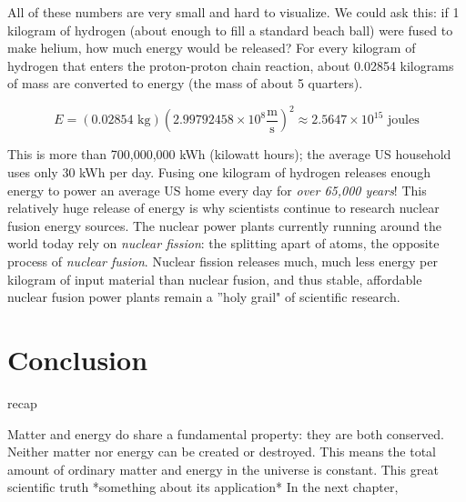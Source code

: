 All of these numbers are very small and hard to visualize. We could ask this: if 
1 kilogram of hydrogen (about enough to fill a standard beach ball) were fused to 
make helium, how much energy would be released? For every kilogram of hydrogen 
that enters the proton-proton chain reaction, about 0.02854 kilograms of mass are 
converted to energy (the mass of about 5 quarters).

$$E = \left( 0.02854 \text{ kg} \right) \left( 2.99792458 \times 10^8 \frac{
\text{m}}{\text{s}} \right)^2 \approx 2.5647 \times 10^{15} \text{ joules}$$

This is more than 700,000,000 kWh (kilowatt hours); the average US household 
uses only 30 kWh per day. Fusing one kilogram of hydrogen releases enough energy 
to power an average US home every day for \textit{over 65,000 years}! This 
relatively huge release of energy is why scientists continue to research nuclear 
fusion energy sources. The nuclear power plants currently running around the world 
today rely on \textit{nuclear fission}: the splitting apart of atoms, the opposite 
process of \textit{nuclear fusion}. Nuclear fission releases much, much less energy 
per kilogram of input material than nuclear fusion, and thus stable, affordable 
nuclear fusion power plants remain a ''holy grail" of scientific research. 

\section{Conclusion}
recap

Matter and energy do share a fundamental property: they are both conserved. Neither matter nor energy can be created or destroyed. This means the total amount of ordinary matter and energy in the universe is constant. This great scientific truth *something about its application* In the next chapter, 











